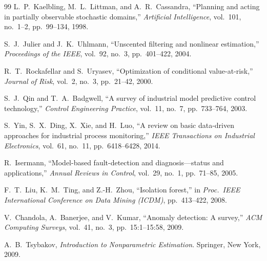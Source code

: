 \begin{thebibliography}{99}
L.~P.~Kaelbling, M.~L.~Littman, and A.~R.~Cassandra,
``Planning and acting in partially observable stochastic domains,''
\emph{Artificial Intelligence}, vol.~101, no.~1--2, pp.~99--134, 1998.

S.~J.~Julier and J.~K.~Uhlmann,
``Unscented filtering and nonlinear estimation,''
\emph{Proceedings of the IEEE}, vol.~92, no.~3, pp.~401--422, 2004.

R.~T.~Rockafellar and S.~Uryasev,
``Optimization of conditional value-at-risk,''
\emph{Journal of Risk}, vol.~2, no.~3, pp.~21--42, 2000.


S.~J.~Qin and T.~A.~Badgwell,
``A survey of industrial model predictive control technology,''
\emph{Control Engineering Practice}, vol.~11, no.~7, pp.~733--764, 2003.

S.~Yin, S.~X.~Ding, X.~Xie, and H.~Luo,
``A review on basic data-driven approaches for industrial process monitoring,''
\emph{IEEE Transactions on Industrial Electronics}, vol.~61, no.~11, pp.~6418--6428, 2014.

R.~Isermann,
``Model-based fault-detection and diagnosis---status and applications,''
\emph{Annual Reviews in Control}, vol.~29, no.~1, pp.~71--85, 2005.


F.~T.~Liu, K.~M.~Ting, and Z.-H.~Zhou,
``Isolation forest,''
in \emph{Proc.\ IEEE International Conference on Data Mining (ICDM)},
pp.~413--422, 2008.

V.~Chandola, A.~Banerjee, and V.~Kumar,
``Anomaly detection: A survey,''
\emph{ACM Computing Surveys}, vol.~41, no.~3, pp.~15:1--15:58, 2009.


A.~B.~Tsybakov,
\emph{Introduction to Nonparametric Estimation}.
Springer, New York, 2009.


\end{thebibliography}
